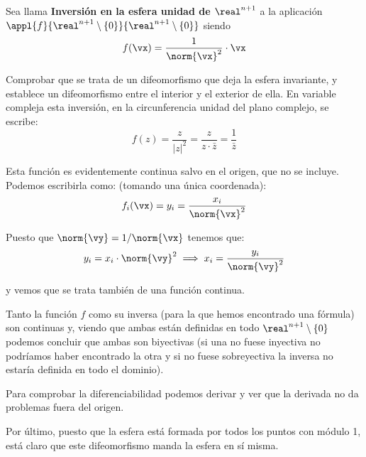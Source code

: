 \begin{problem}[10]
Sea llama \textbf{Inversión en la esfera unidad de $\real^{n+1}$} a la aplicación $\appl{f}{\real^{n+1}\setminus \{0\}}{\real^{n+1}\setminus \{0\}}$ siendo
\[f(\vx)=\frac{1}{\norm{\vx}^2} \cdot \vx\]

Comprobar que se trata de un difeomorfismo que deja la esfera invariante, y establece un difeomorfismo entre el interior y el exterior de ella. En variable compleja esta inversión, en la circunferencia unidad del plano complejo, se escribe:
\[f(z)=\frac{z}{|z|^2}=\frac{z}{z\cdot \bar{z}} = \frac{1}{\bar{z}}\]

\solution
{}

Esta función es evidentemente continua salvo en el origen, que no se incluye. Podemos escribirla como: (tomando una única coordenada):
\[f_i(\vx)=y_i=\frac{x_i}{\norm{\vx}^2}\]

Puesto que $\norm{\vy}=1/\norm{\vx}$ tenemos que:
\[y_i = x_i \cdot \norm{\vy}^2 \implies x_i = \frac{y_i}{\norm{\vy}^2}\]

y vemos que se trata también de una función continua.

Tanto la función $f$ como su inversa (para la que hemos encontrado una fórmula) son continuas y, viendo que ambas están definidas en todo $\real^{n+1}\setminus \{0\}$ podemos concluir que ambas son biyectivas (si una no fuese inyectiva no podríamos haber encontrado la otra y si no fuese sobreyectiva la inversa no estaría definida en todo el dominio).

Para comprobar la diferenciabilidad podemos derivar y ver que la derivada no da problemas fuera del origen.

Por último, puesto que la esfera está formada por todos los puntos con módulo 1, está claro que este difeomorfismo manda la esfera en sí misma.

\end{problem}

